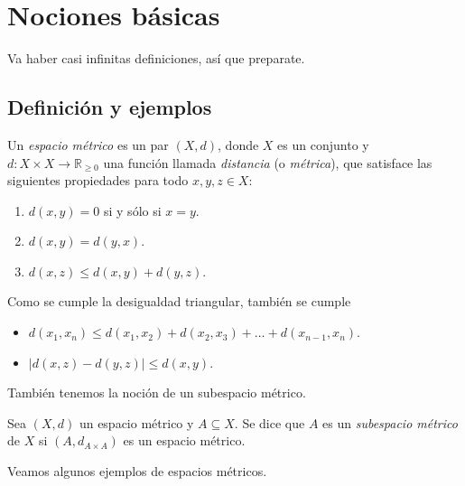 \chapter{Nociones básicas}

Va haber casi infinitas definiciones, así que preparate.

\section{Definición y ejemplos}

\begin{definition}
	Un \emph{espacio métrico} es un par $(X, d)$, donde $X$ es un conjunto y $d: X \times X \to \mathbb{R}_{\geq 0}$ una función llamada \emph{distancia} (o \emph{métrica}), que satisface las siguientes propiedades para todo $x, y, z \in X$:
	\begin{enumerate}
		\item $d(x, y) = 0$ si y sólo si $x = y$.
		\item $d(x, y) = d(y, x)$.
		\item $d(x, z) \leq  d(x, y) + d(y, z)$.
	\end{enumerate}
\end{definition}

\begin{remark}
	Como se cumple la desigualdad triangular, también se cumple
	\begin{itemize}
		\item $d(x_{1}, x_{n}) \leq d(x_{1}, x_{2}) + d(x_{2}, x_{3}) + \dots + d(x_{n-1}, x_{n})$.
		\item $\lvert d(x, z) - d(y, z) \rvert \leq d(x, y)$.
	\end{itemize}
\end{remark}

También tenemos la noción de un subespacio métrico.

\begin{definition}
	Sea $(X, d)$ un espacio métrico y $A \subseteq X$. Se dice que $A$ es un \emph{subespacio métrico} de $X$ si $(A, d_{A \times A})$ es un espacio métrico.
\end{definition}

Veamos algunos ejemplos de espacios métricos.


